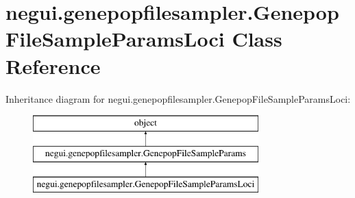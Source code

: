 \hypertarget{classnegui_1_1genepopfilesampler_1_1GenepopFileSampleParamsLoci}{}\section{negui.\+genepopfilesampler.\+Genepop\+File\+Sample\+Params\+Loci Class Reference}
\label{classnegui_1_1genepopfilesampler_1_1GenepopFileSampleParamsLoci}
Inheritance diagram for negui.\+genepopfilesampler.\+Genepop\+File\+Sample\+Params\+Loci\+:\begin{figure}[H]
\begin{center}
\leavevmode
\includegraphics[height=3.000000cm]{classnegui_1_1genepopfilesampler_1_1GenepopFileSampleParamsLoci}
\end{center}
\end{figure}
